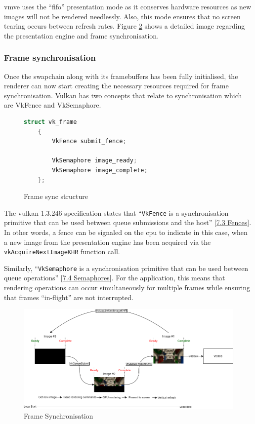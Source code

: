 \documentclass[11pt]{article}
\begin{document}
\gls*{vmve} uses the ``fifo'' presentation mode as it conserves hardware
resources as new images will not be rendered needlessly. Also, this mode ensures
that no screen tearing occurs between refresh rates. Figure \ref{fig:frame_sync}
shows a detailed image regarding the presentation engine and frame
synchronisation.

\subsubsection{Frame synchronisation}
Once the swapchain along with its framebuffers has been fully initialised, the
renderer can now start creating the necessary resources required for frame
synchronisation. Vulkan has two concepts that relate to synchronisation which
are VkFence and VkSemaphore.

\begin{figure}[H]
  \centering
  \begin{lstlisting}[language=C++]
    struct vk_frame
    {
        VkFence submit_fence;

        VkSemaphore image_ready;
        VkSemaphore image_complete;
    };
  \end{lstlisting}
  \caption{Frame sync structure}
  \label{fig:vk_fence}
\end{figure}

The \gls*{vulkan} 1.3.246 specification states that  ``\lstinline{VkFence} is a
synchronisation primitive that can be used between queue submissions and the
host''
[\href{https://registry.khronos.org/vulkan/specs/1.3-extensions/man/html/VkFence.html}{7.3
Fences}]. In other words, a fence can be signaled on the \gls*{cpu} to indicate
in this case, when a new image from the presentation engine has been acquired
via the \lstinline{vkAcquireNextImageKHR} function call.

Similarly, ``\lstinline{VkSemaphore} is a synchronisation primitive that can be
used between queue operations''
[\href{https://registry.khronos.org/vulkan/specs/1.3-extensions/man/html/VkSemaphore.html}{7.4
Semaphores}]. For the application, this means that rendering operations can
occur simultaneously for multiple frames while ensuring that frames
``in-flight'' are not interrupted.


\begin{figure}[H]
  \centering
  \includegraphics[width=\textwidth]{images/frame_sync.png}
  \caption{Frame Synchronisation}
  \label{fig:frame_sync}
\end{figure}
\end{document}
